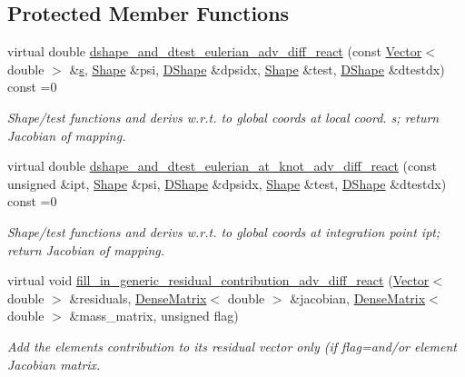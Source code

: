 \subsection*{Protected Member Functions}
\begin{DoxyCompactItemize}
\item 
virtual double \hyperlink{classoomph_1_1AdvectionDiffusionReactionEquations_a227bda2d1384aaa46dff37ccd370e6d6}{dshape\+\_\+and\+\_\+dtest\+\_\+eulerian\+\_\+adv\+\_\+diff\+\_\+react} (const \hyperlink{classoomph_1_1Vector}{Vector}$<$ double $>$ \&\hyperlink{cfortran_8h_ab7123126e4885ef647dd9c6e3807a21c}{s}, \hyperlink{classoomph_1_1Shape}{Shape} \&psi, \hyperlink{classoomph_1_1DShape}{D\+Shape} \&dpsidx, \hyperlink{classoomph_1_1Shape}{Shape} \&test, \hyperlink{classoomph_1_1DShape}{D\+Shape} \&dtestdx) const =0
\begin{DoxyCompactList}\small\item\em Shape/test functions and derivs w.\+r.\+t. to global coords at local coord. s; return Jacobian of mapping. \end{DoxyCompactList}\item 
virtual double \hyperlink{classoomph_1_1AdvectionDiffusionReactionEquations_acd01ced36610cb5e69ee359df778ba09}{dshape\+\_\+and\+\_\+dtest\+\_\+eulerian\+\_\+at\+\_\+knot\+\_\+adv\+\_\+diff\+\_\+react} (const unsigned \&ipt, \hyperlink{classoomph_1_1Shape}{Shape} \&psi, \hyperlink{classoomph_1_1DShape}{D\+Shape} \&dpsidx, \hyperlink{classoomph_1_1Shape}{Shape} \&test, \hyperlink{classoomph_1_1DShape}{D\+Shape} \&dtestdx) const =0
\begin{DoxyCompactList}\small\item\em Shape/test functions and derivs w.\+r.\+t. to global coords at integration point ipt; return Jacobian of mapping. \end{DoxyCompactList}\item 
virtual void \hyperlink{classoomph_1_1AdvectionDiffusionReactionEquations_a66d61f635f3d733b5e70de9552cdaf6b}{fill\+\_\+in\+\_\+generic\+\_\+residual\+\_\+contribution\+\_\+adv\+\_\+diff\+\_\+react} (\hyperlink{classoomph_1_1Vector}{Vector}$<$ double $>$ \&residuals, \hyperlink{classoomph_1_1DenseMatrix}{Dense\+Matrix}$<$ double $>$ \&jacobian, \hyperlink{classoomph_1_1DenseMatrix}{Dense\+Matrix}$<$ double $>$ \&mass\+\_\+matrix, unsigned flag)
\begin{DoxyCompactList}\small\item\em Add the element\textquotesingle{}s contribution to its residual vector only (if flag=and/or element Jacobian matrix. \end{DoxyCompactList}\end{DoxyCompactItemize}
